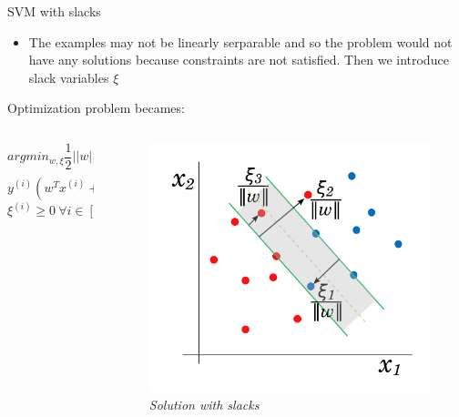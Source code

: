 \begin{frame}{SVM with slacks}
	\begin{itemize}\setlength\itemsep{1em}
		\item The examples may not be linearly serparable and so the problem would not have any solutions because constraints are not satisfied. Then we introduce slack variables $\xi$
	\end{itemize}
	Optimization problem becames:
	\begin{columns}
		\begin{column}{0.5\textwidth}\centering
			$$arg min_{w, \xi} \frac{1}{2} ||w||^2 + C \sum_{i = 1}{n}\xi^{(i)}$$
			$$y^{(i)} (w^T x^{(i)} + b) \geq 1 - \xi^{(i)} \ \forall i \in [1, n]$$
			$$\xi^{(i)} \geq 0 \ \forall i \in [1, n]$$
		\end{column}
		\begin{column}{0.5\textwidth}\centering
			\begin{figure}[htbp]
				\centering
				\includegraphics[scale = 0.15]{./images/slack2.png}
				\caption{\textit{Solution with slacks}}
			\end{figure}
		\end{column}
	\end{columns}
	
\end{frame}